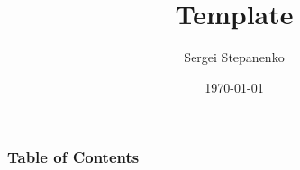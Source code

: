 \documentclass[10pt]{beamer}
\title{Template}
\author[Sergei Stepanenko]
{Sergei Stepanenko}
\institute[AU]
{
  \inst{1}
  Aarhus University
}
\date{\today}
\begin{document}
\frame{\titlepage}

\begin{frame}
  \frametitle{Table of Contents}
  \tableofcontents
\end{frame}
\end{document}
